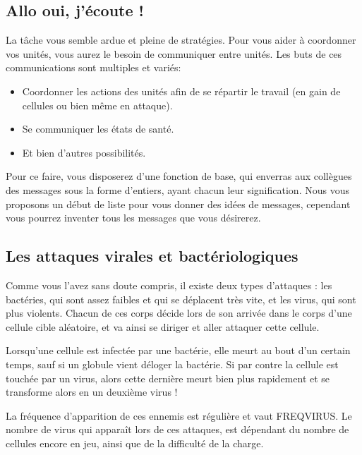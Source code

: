 \documentclass[a4paper,twoside,12pt]{article}
\begin{document}
\subsection{Allo oui, j'\'ecoute !}

La  t\^ache vous  semble ardue  et pleine  de strat\'egies.  Pour vous
aider \`a coordonner vos unit\'es, vous aurez le besoin de communiquer
entre  unit\'es.  Les  buts de  ces communications  sont  multiples et
vari\'es:

\begin{itemize}
\item Coordonner  les actions  des unit\'es afin  de se  r\'epartir le
travail (en gain de cellules ou bien m\^eme en attaque).
\item Se communiquer les \'etats de sant\'e.
\item Et bien d'autres possibilit\'es.
\end{itemize}

Pour ce  faire, vous disposerez  d'une fonction de base,  qui enverras
aux  coll\`egues des messages  sous la  forme d'entiers,  ayant chacun
leur signification.  Nous vous proposons un d\'ebut de liste pour vous
donner des  id\'ees de messages, cependant vous  pourrez inventer tous
les messages que vous d\'esirerez.


\subsection{Les attaques virales et bact\'eriologiques}

Comme vous l'avez sans doute  compris, il existe deux types d'attaques
: les bact\'eries, qui sont assez faibles et qui se d\'eplacent tr\`es
vite,  et les  virus,  qui sont  plus  violents. Chacun  de ces  corps
d\'ecide  lors de  son arriv\'ee  dans  le corps  d'une cellule  cible
al\'eatoire, et va ainsi se diriger et aller attaquer cette cellule.

Lorsqu'une cellule  est infect\'ee par  une bact\'erie, elle  meurt au
bout  d'un  certain temps,  sauf  si  un  globule vient  d\'eloger  la
bact\'erie. Si par contre la cellule est touch\'ee par un virus, alors
cette derni\`ere meurt bien plus  rapidement et se transforme alors en
un deuxi\`eme virus !

La fr\'equence  d'apparition de ces ennemis est  r\'eguli\`ere et vaut
FREQVIRUS.  Le nombre de  virus qui appara\^it lors de ces
attaques, est d\'ependant  du nombre de cellules encore  en jeu, ainsi
que de la difficult\'e de la charge.
\end{document}

